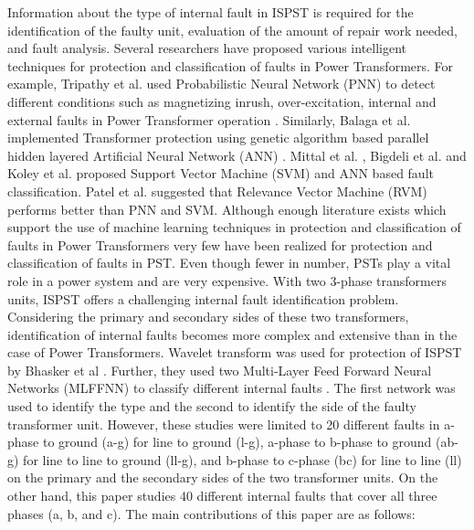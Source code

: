 \documentclass[conference]{IEEEtran}
\begin{document}
Information about the type of internal fault in ISPST is required for the identification of the faulty unit, evaluation of the amount of repair work needed, and fault analysis. Several researchers have proposed various intelligent techniques for protection and classification of faults in Power Transformers. For example, Tripathy et al. used Probabilistic Neural Network (PNN) to detect different conditions such as magnetizing inrush, over-excitation, internal and external faults in Power Transformer operation \cite{tripathy}. Similarly, Balaga et al. implemented Transformer protection using genetic algorithm based parallel hidden layered Artificial Neural Network (ANN) \cite{balaga}. Mittal et al. \cite{mittal}, Bigdeli et al. \cite{bigdeli} and Koley et al. \cite{koley} proposed Support Vector Machine (SVM) and ANN based fault classification. Patel et al. \cite{patel} suggested that Relevance Vector Machine (RVM) performs better than PNN and SVM. Although enough literature exists which support the use of machine learning techniques in protection and classification of faults in Power Transformers very few have been realized for protection and classification of faults in PST. Even though fewer in number, PSTs play a vital role in a power system and are very expensive. With two 3-phase transformers units, ISPST offers a challenging internal fault identification problem. Considering the primary and secondary sides of these two transformers, identification of internal faults becomes more complex and extensive than in the case of Power Transformers. Wavelet transform was used for protection of ISPST by Bhasker et al \cite{paper2}. Further, they used two Multi-Layer Feed Forward Neural Networks (MLFFNN) to classify different internal faults \cite{pallav}. The first network was used to identify the type and the second to identify the side of the faulty transformer unit. However, these studies were limited to 20 different faults in a-phase to ground (a-g) for line to ground (l-g), a-phase to b-phase to ground (ab-g) for line to line to ground (ll-g), and b-phase to c-phase (bc) for line to line (ll) on the primary and the secondary sides of the two transformer units. On the other hand, this paper studies 40 different internal faults that cover all three phases (a, b, and c). The main contributions of this paper are as follows:
\end{document}
